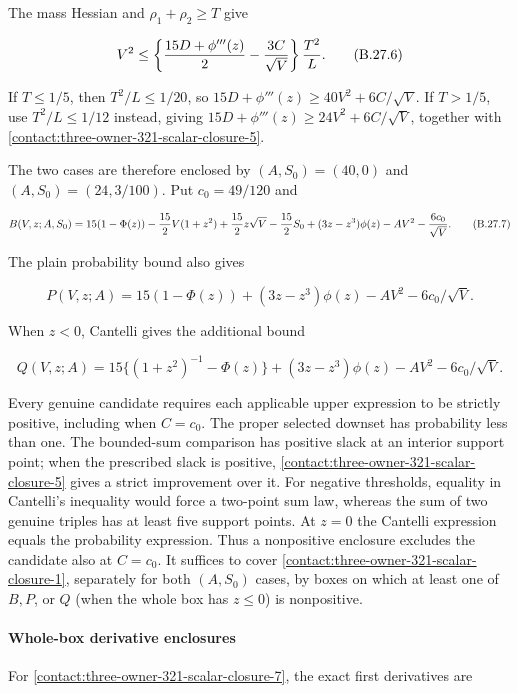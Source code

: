 The mass Hessian and $\rho_1+\rho_2\ge T$ give

\[
 V^2\le\left\{{15D+\phi'''(z)\over2}-{3C\over\sqrt V}\right\}{T^2\over L}.
\tag{B.27.6}\label{contact:three-owner-321-scalar-closure-6}
\]

If $T\le 1/5$, then $T^2/L\le 1/20$, so
$15D+\phi'''(z)\ge 40V^2+6C/\sqrt{V}$. If $T>1/5$, use $T^2/L\le 1/12$
instead, giving $15D+\phi'''(z)\ge 24V^2+6C/\sqrt{V}$, together with \eqref{contact:three-owner-321-scalar-closure-5}.

The two cases are therefore enclosed by $(A,S_0)=(40,0)$ and
$(A,S_0)=(24,3/100)$. Put $c_0=49/120$ and

\[
 B(V,z;A,S_0)=15(1-\Phi(z))-{15\over2}V(1+z^2)
 +{15\over2}z\sqrt V-{15\over2}S_0
 +(3z-z^3)\phi(z)-AV^2-{6c_0\over\sqrt V}.
\tag{B.27.7}\label{contact:three-owner-321-scalar-closure-7}
\]

The plain probability bound also gives

\[
 P(V,z;A)=15(1-\Phi(z))+(3z-z^3)\phi(z)-AV^2-6c_0/\sqrt V.
\]

When $z<0$, Cantelli gives the additional bound

\[
 Q(V,z;A)=15\{(1+z^2)^{-1}-\Phi(z)\}
 +(3z-z^3)\phi(z)-AV^2-6c_0/\sqrt V.
\tag{B.27.8}\label{contact:three-owner-321-scalar-closure-8}
\]

Every genuine candidate requires each applicable upper expression to
be strictly positive, including when $C=c_0$. The proper selected
downset has probability less than one. The bounded-sum comparison has
positive slack at an interior support point; when the prescribed slack
is positive, \eqref{contact:three-owner-321-scalar-closure-5} gives a
strict improvement over it. For negative thresholds, equality in
Cantelli's inequality would force a two-point sum law, whereas the sum
of two genuine triples has at least five support points. At $z=0$ the
Cantelli expression equals the probability expression. Thus a
nonpositive enclosure excludes the candidate also at $C=c_0$.
It suffices to cover \eqref{contact:three-owner-321-scalar-closure-1},
separately for both $(A,S_0)$ cases, by boxes on which at least one of
$B,P$, or $Q$ (when the whole box has $z\le0$) is nonpositive.

\paragraph{Whole-box derivative enclosures}

For \eqref{contact:three-owner-321-scalar-closure-7}, the exact first derivatives are

